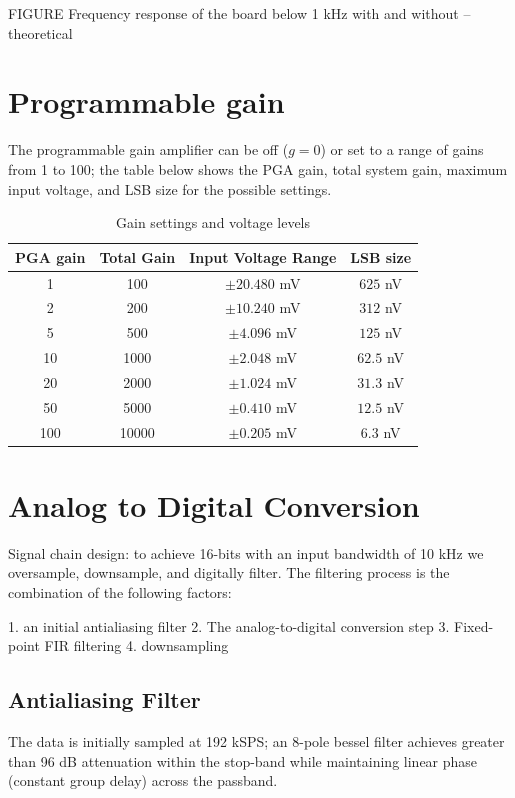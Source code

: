 FIGURE Frequency response of the board below 1 kHz with and without --
theoretical


\section{Programmable gain}
The programmable gain amplifier can be off ($g=0$) or set to a range
of gains from 1 to 100; the table below shows the PGA gain, total
system gain, maximum input voltage, and LSB size for the possible
settings.

\begin{table}
\begin{centering}
\begin{tabular}[h!]{|c|c|c|c|}
\hline
PGA gain & Total Gain & Input Voltage Range & LSB size \\
\hline
1 & 100 & $\pm20.480$ mV & $625$ nV \\
2 & 200 & $\pm10.240$ mV & $312$ nV \\
5 & 500 & $\pm4.096$ mV & $125$ nV \\
10 & 1000 & $\pm2.048$ mV & $62.5$ nV \\
20 & 2000 & $\pm1.024$ mV & $31.3$ nV \\
50 & 5000 & $\pm0.410$ mV & $12.5$ nV \\
100 & 10000 & $\pm0.205$ mV & $6.3$ nV \\
\hline
\end{tabular}
\end{centering}
\caption{Gain settings and voltage levels}
\end{table}

\section{Analog to Digital Conversion}
Signal chain design: to achieve 16-bits with an input bandwidth of 10
kHz we oversample, downsample, and digitally filter. The filtering
process is the combination of the following factors:

1. an initial antialiasing filter
2. The analog-to-digital conversion step
3. Fixed-point FIR filtering
4. downsampling



\subsection{Antialiasing Filter}
The data is initially sampled at 192 kSPS; an 8-pole bessel filter
achieves greater than 96 dB attenuation within the stop-band while
maintaining linear phase (constant group delay) across the passband.

